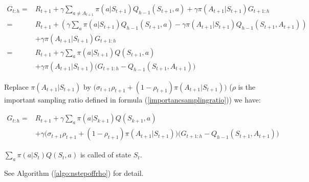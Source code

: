 \begin{equation}
	\begin{split}
		G_{t:h} =& R_{t+1}+\gamma \sum_{a\neq A_{t+1}} \pi(a|S_{t+1}) Q_{h-1}(S_{t+1},a) + \gamma \pi(A_{t+1}|S_{t+1})G_{t+1:h} \\
		=& R_{t+1} + \left (\gamma \sum_a \pi(a|S_{t+1})Q_{h-1}(S_{t+1},a) - \gamma \pi(A_{t+1}|S_{t+1})Q_{h-1}(S_{t+1},A_{t+1}) \right)\\
		&+ \gamma \pi(A_{t+1}|S_{t+1})G_{t+1:h} \\
		=& R_{t+1} + \gamma \sum_a \pi(a|S_{t+1})Q(S_{t+1},a) \\
		&+ \gamma \pi(A_{t+1}|S_{t+1})\Big (G_{t+1:h} -Q_{h-1}(S_{t+1},A_{t+1})  \Big)
	\end{split}
\end{equation}

Replace $\pi(A_{t+1}|S_{t+1})$ by $\Big(\sigma_{t+1} \rho_{t+1} + (1-\rho_{t+1})\pi(A_{t+1}|S_{t+1}) \Big)$ ($\rho$ is the important sampling ratio defined in formula (\ref{importancsamplingratio})) we have:

\begin{equation}
	\begin{split}
		G_{t:h} =& R_{t+1} + \gamma \sum_a \pi(a|S_{k+1})Q(S_{k+1},a) \\
		&+ \gamma \Big ( \sigma_{t+1} \rho_{t+1} + (1-\rho_{t+1})\pi(A_{t+1}|S_{t+1}) \Big) \Big(G_{t+1:h} -Q_{h-1}(S_{t+1},A_{t+1}) \Big)
	\end{split}
\end{equation}


$\sum\limits_a \pi(a|S_{t})Q(S_{t},a)$ is called  of state $S_t$.


See Algorithm (\ref{algo:nstepoffrho}) for detail.


